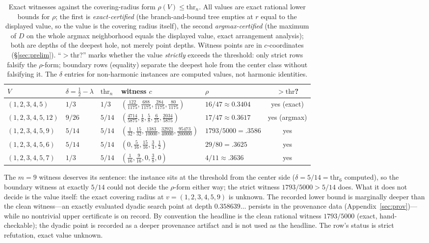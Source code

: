 \begin{table}[htbp]
\centering
\footnotesize
\caption{Exact witnesses against the covering-radius form
$\rho(V)\le\mathrm{thr}_n$. All values are exact rational lower bounds
for $\rho$; the first is \emph{exact-certified} (the branch-and-bound
tree empties at $r$ equal to the displayed value, so the value is the
covering radius itself), the second \emph{argmax-certified} (the
maximum of $D$ on the whole argmax neighborhood equals the displayed
value, exact arrangement analysis); both are depths of the deepest
hole, not merely point depths. Witness points are in $c$-coordinates
(\S\ref{sec:prelim}). ``$>\mathrm{thr}$?'' marks whether the value
\emph{strictly} exceeds the threshold: only strict rows falsify the
$\rho$-form; boundary rows (equality) separate the deepest hole from
the center class without falsifying it. The $\delta$ entries for
non-harmonic instances are computed values, not harmonic identities.}
\label{tab:refute}
\begin{tabularx}{\textwidth}{@{} l l l >{\raggedright\arraybackslash}X l c @{}}
\toprule
$V$ & $\delta=\tfrac12-\lambda$ & $\mathrm{thr}_n$ & witness $c$ &
$\rho$ & $>\mathrm{thr}$? \\
\midrule
$(1,2,3,4,5)$ & $1/3$ & $1/3$ &
$(\tfrac{122}{1175},\tfrac{688}{1175},\tfrac{284}{1175},
\tfrac{80}{1175})$ &
$16/47\approx0.3404$ & yes (exact) \\
$(1,2,3,4,5,12)$ & $9/26$ & $5/14$ &
$(\tfrac{4714}{5875},\tfrac18,\tfrac58,\tfrac6{25},
\tfrac{2034}{5875})$ &
$17/47\approx0.3617$ & yes (argmax) \\
$(1,2,3,4,5,9)$ & $5/14$ & $5/14$ &
$(\tfrac1{32},\tfrac{15}{32},\tfrac{1383}{10000},
\tfrac{32921}{40000},\tfrac{95473}{200000})$ &
$1793/5000=.3586$ & yes \\
$(1,2,3,4,5,6)$ & $5/14$ & $5/14$ &
$(0,\tfrac5{16},\tfrac{15}{16},\tfrac34,\tfrac12)$ & $29/80=.3625$ &
yes \\
$(1,2,3,4,5,7)$ & $1/3$ & $5/14$ &
$(\tfrac1{16},\tfrac9{16},0,\tfrac38,0)$ & $4/11{\approx}.3636$ & yes
\\
\bottomrule
\end{tabularx}
\end{table}

The $m=9$ witness deserves its sentence: the instance sits at the
threshold from the center side ($\delta=5/14=\mathrm{thr}_6$ computed),
so the boundary witness at exactly $5/14$ could not decide the
$\rho$-form either way; the strict witness $1793/5000>5/14$ does. What
it does not decide is the value itself: the exact covering radius at
$v=(1,2,3,4,5,9)$ is unknown. The recorded lower bound is marginally
deeper than the clean witness---an exactly evaluated dyadic search
point at depth $0.358639\ldots$ persists in the provenance data
(Appendix~\ref{sec:prov})---while no nontrivial upper certificate is
on record. By convention the headline is the clean rational witness
$1793/5000$ (exact, hand-checkable); the dyadic point is recorded as a
deeper provenance artifact and is not used as the headline. The row's
status is strict refutation, exact value unknown.


